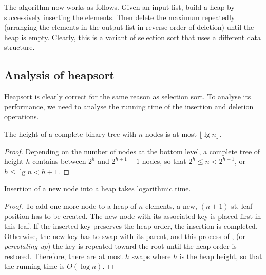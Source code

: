 The  algorithm now works as follows. Given an input list, 
build a heap by successively inserting the elements. Then delete the maximum 
repeatedly (arranging the elements in the output list in reverse order of 
deletion) until the heap is empty. Clearly, this is a variant of selection 
sort that uses a different data structure.

\subsection*{Analysis of heapsort}

Heapsort is clearly correct for the same reason as selection sort. To analyse its
performance, we need to analyse the running time of the insertion and deletion 
operations.

\begin{Lemma}\label{lem:tree:height}
The height of a complete binary tree with $n$ nodes
is at most $\lfloor \lg n \rfloor$.
\end{Lemma}

\begin{proof} Depending on the number of nodes at the bottom level,
a complete tree of height $h$ contains between $2^{h}$ and
$2^{h+1}-1$ nodes, so that \(2^{h} \le n < 2^{h+1}\),
or \(h \le \lg n < h+1\). \end{proof}


\begin{Lemma} 
Insertion of a new node into a heap takes logarithmic time. 
\end{Lemma}

\begin{proof}
To add one more node to a heap of \(n\) elements, a new,
\((n+1)\)-st, leaf position has to be created. The new node with 
its associated key is placed first in this leaf.  
If the inserted key preserves the heap order, the insertion is
completed. Otherwise, the new key has to swap with
its parent, and this process of , 
(or \emph{percolating up}) the key is repeated toward the root until the heap 
order is restored. Therefore, there are at most $h$ swaps where $h$ is the heap 
height, so that the running time is $O(\log n)$.
\end{proof}

